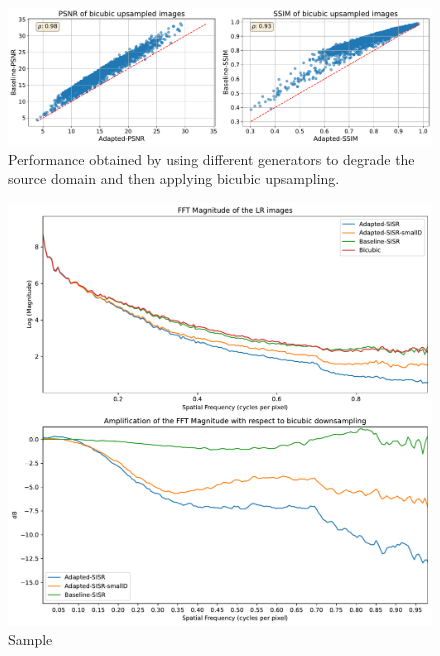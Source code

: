         \begin{figure}[h!]
            \centering
            \includegraphics[width=\linewidth]{Includes/5-source-domain-bicubic-upsampling-comparison.pdf}
            \caption{Performance obtained by using different generators to degrade the source domain and then applying bicubic upsampling.}
            \label{fig:5-source-domain-bicubic-upsampling-comparison}
        \end{figure}

        \begin{figure}[h!]
            \centering
            \includegraphics[scale=0.5]{Includes/6-lr-images-fft-comparison.pdf}
            \caption{Sample }
            \label{fig:6-source_domain_fft_comparison}
        \end{figure}
        
    
